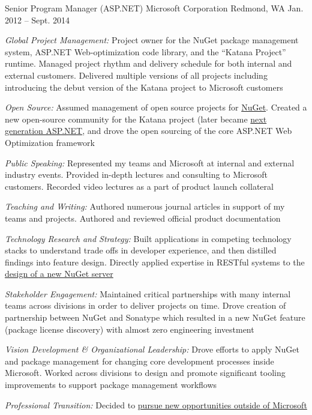 \begin{cventries}
\cventry 
{Senior Program Manager (ASP.NET)}
{Microsoft Corporation}
{Redmond, WA}
{Jan. 2012 – Sept. 2014}
{ %
\begin{cvitems}
\item {\emph{Global Project Management:} Project owner for the NuGet package management system, ASP.NET Web-optimization code library, and the “Katana Project” runtime. Managed project rhythm and delivery schedule for both internal and external customers. Delivered multiple versions of all projects including introducing the debut version of the Katana project to Microsoft customers }
\item {\emph{Open Source:}  Assumed management of open source projects for \href{https://github.com/NuGet}{NuGet}. Created a new open-source community for the Katana project (later became \href{https://github.com/aspnet/GetStarted}{next generation ASP.NET}, and drove the open sourcing of the core ASP.NET Web Optimization framework }
\item {\emph{Public Speaking:} Represented my teams and Microsoft at internal and external industry events. Provided in-depth lectures and consulting to Microsoft customers. Recorded video lectures as a part of product launch collateral }
\item {\emph{Teaching and Writing:} Authored numerous journal articles in support of my teams and projects. Authored and reviewed official product documentation }
\item {\emph{Technology Research and Strategy:} Built applications in competing technology stacks to understand trade offs in developer experience, and then distilled findings into feature design. Directly applied expertise in RESTful systems to the \href{https://docs.nuget.org/ndocs/api/nuget-api-v3}{design of a new NuGet server} }
\item {\emph{Stakeholder Engagement:} Maintained critical partnerships with many internal teams across divisions in order to deliver projects on time. Drove creation of partnership between NuGet and Sonatype which resulted in a new NuGet feature (package license discovery) with almost zero engineering investment }
\item {\emph{Vision Development \& Organizational Leadership:} Drove efforts to apply NuGet and package management for changing core development processes inside Microsoft. Worked across divisions to design and promote significant tooling improvements to support package management workflows }
\item {\emph{Professional Transition:} Decided to \href{https://www.howarddierking.com/2014/08/14/leaving-microsoft/}{pursue new opportunities outside of Microsoft} }
\end{cvitems}
}


\end{cventries}
